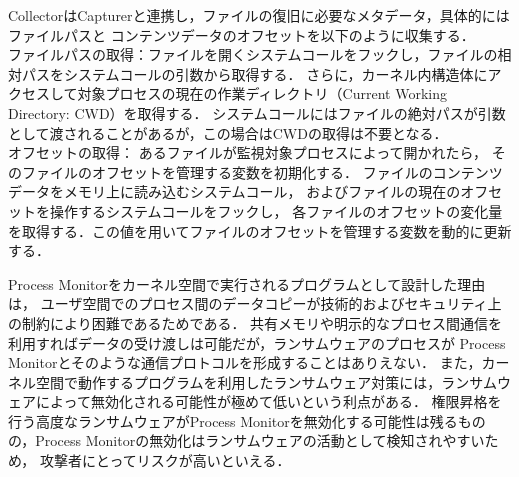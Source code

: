 CollectorはCapturerと連携し，ファイルの復旧に必要なメタデータ，具体的にはファイルパスと
コンテンツデータのオフセットを以下のように収集する．
\\
ファイルパスの取得：ファイルを開くシステムコールをフックし，ファイルの相対パスをシステムコールの引数から取得する．
さらに，カーネル内構造体にアクセスして対象プロセスの現在の作業ディレクトリ（Current Working Directory: CWD）を取得する．
システムコールにはファイルの絶対パスが引数として渡されることがあるが，この場合はCWDの取得は不要となる．
\\
オフセットの取得：
あるファイルが監視対象プロセスによって開かれたら，
そのファイルのオフセットを管理する変数を初期化する．
ファイルのコンテンツデータをメモリ上に読み込むシステムコール，
およびファイルの現在のオフセットを操作するシステムコールをフックし，
各ファイルのオフセットの変化量を取得する．この値を用いてファイルのオフセットを管理する変数を動的に更新する．

Process Monitorをカーネル空間で実行されるプログラムとして設計した理由は，
ユーザ空間でのプロセス間のデータコピーが技術的およびセキュリティ上の制約により困難であるためである．
共有メモリや明示的なプロセス間通信を利用すればデータの受け渡しは可能だが，ランサムウェアのプロセスが
Process Monitorとそのような通信プロトコルを形成することはありえない．
また，カーネル空間で動作するプログラムを利用したランサムウェア対策には，ランサムウェアによって無効化される可能性が極めて低いという利点がある\cite{mitigation-modern}．
権限昇格を行う高度なランサムウェアがProcess Monitorを無効化する可能性は残るものの，Process Monitorの無効化はランサムウェアの活動として検知されやすいため，
攻撃者にとってリスクが高いといえる．


